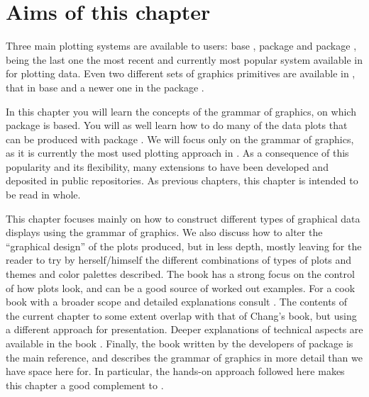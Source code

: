 \documentclass[krantz2]{krantz}\usepackage{knitr}%
\begin{document}
\section{Aims of this chapter}

Three main plotting systems are available to \Rlang users: base \Rlang, package  \autocite{Sarkar2008} and package  \autocite{Wickham2016}, being the last one the most recent and currently most popular system available in \Rlang for plotting data. Even two different sets of graphics primitives are available in \Rlang, that in base \Rlang and a newer one in the  package \autocite{Murrell2011}.

In this chapter you will learn the concepts of the grammar of graphics, on which package  is based. You will as well learn how to do many of the data plots that can be produced with package . We will focus only on the grammar of graphics, as it is currently the most used plotting approach in \Rlang. As a consequence of this popularity and its flexibility, many extensions to  have been developed and deposited in public repositories. As previous chapters, this chapter is intended to be read in whole.

This chapter focuses mainly on how to construct different types of graphical data displays using the grammar of graphics. We also discuss how to alter the ``graphical design'' of the plots produced, but in less depth, mostly leaving for the reader to try by herself/himself the different combinations of types of plots and themes and color palettes described. The book  \autocite{Burchell2016} has a strong focus on the control of how plots look, and can be a good source of worked out examples. For a cook book with a broader scope and detailed explanations consult  \autocite{Chang2018}. The contents of the current chapter to some extent overlap with that of Chang's book, but using a different approach for presentation. Deeper explanations of technical aspects are available in the book  \autocite{Murrell2011}. Finally, the book  \autocite{Wickham2016} written by the developers of package  is the main reference, and describes the grammar of graphics in more detail than we have space here for. In particular, the hands-on approach followed here makes this chapter a good complement to .
\end{document}
